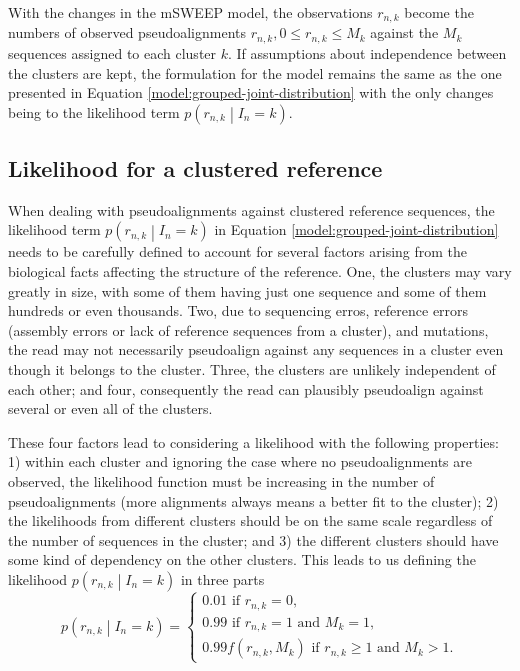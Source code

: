 \documentclass[officiallayout]{tktla}
\begin{document}
With the changes in the mSWEEP model, the observations $r_{n, k}$
become the numbers of observed pseudoalignments $r_{n, k}, 0 \leq
r_{n, k} \leq M_{k}$ against the $M_{k}$ sequences assigned to each
cluster $k$. If assumptions about independence between the clusters
are kept, the formulation for the model remains the same as the one
presented in Equation \ref{model:grouped-joint-distribution} with the
only changes being to the likelihood term $p\left(r_{n, k} \middle|
I_{n} = k\right)$.


\subsection{Likelihood for a clustered reference}

When dealing with pseudoalignments against clustered reference
sequences, the likelihood term $p\left(r_{n, k} \middle| I_{n} =
k\right)$ in Equation \ref{model:grouped-joint-distribution} needs to
be carefully defined to account for several factors arising from the
biological facts affecting the structure of the reference. One, the
clusters may vary greatly in size, with some of them having just one
sequence and some of them hundreds or even thousands. Two, due to
sequencing erros, reference errors (assembly errors or lack of
reference sequences from a cluster), and mutations, the read may not
necessarily pseudoalign against any sequences in a cluster even though
it belongs to the cluster. Three, the clusters are unlikely
independent of each other; and four, consequently the read can
plausibly pseudoalign against several or even all of the clusters.

These four factors lead to considering a likelihood with the following
properties: 1) within each cluster and ignoring the case where no
pseudoalignments are observed, the likelihood function must be
increasing in the number of pseudoalignments (more alignments always
means a better fit to the cluster); 2) the likelihoods from different
clusters should be on the same scale regardless of the number of
sequences in the cluster; and 3) the different clusters should have
some kind of dependency on the other clusters. This leads to us
defining the likelihood $p\left(r_{n, k} \middle| I_{n} = k\right)$ in
three parts
\begin{equation}
  \label{likelihood:without-normalization}
  p\left(r_{n, k} \middle| I_{n} = k\right) =
  \begin{cases}
    0.01\text{ if } r_{n, k} = 0, \\
    0.99\text{ if } r_{n, k} = 1 \text{ and } M_{k} = 1, \\
    0.99f\left(r_{n, k}, M_{k}\right)\text{ if } r_{n, k} \geq 1\text{ and } M_{k} > 1.
  \end{cases}
\end{equation}
\end{document}
